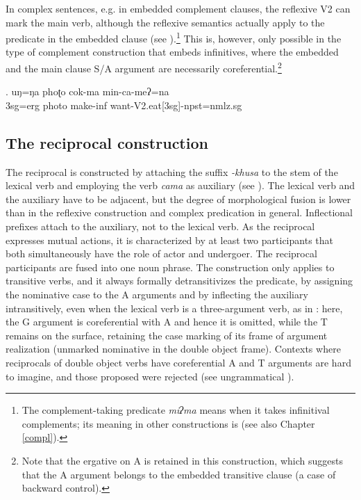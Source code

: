 In complex sentences, e.g. in embedded complement clauses, the reflexive V2 can mark the main verb, although the reflexive semantics actually apply to the predicate in the embedded clause (see \Next).\footnote{The complement-taking predicate \emph{miʔma} means  when it takes infinitival complements; its meaning in other constructions is  (see also Chapter \ref{compl}).} This is, however, only possible in the type of complement construction that embeds infinitives, where the embedded and the main clause  S/A argument are necessarily coreferential.\footnote{Note that the ergative on A is retained in this construction, which suggests that the A argument belongs to the embedded transitive clause (a case of backward control).} 


\exg. uŋ=ŋa phoʈo cok-ma min-ca-meʔ=na\\
		{\sc 3sg=erg} photo make{\sc -inf} want-{\sc V2.eat[3sg]-npst=nmlz.sg}	\\
 	



\subsection{The reciprocal construction}\label{refl3}

The reciprocal is constructed by attaching the suffix \emph{-khusa} to the stem of the lexical verb and employing the verb \emph{cama}  as auxiliary (see \Next[a]). The lexical verb and the auxiliary have to be adjacent, but the degree of morphological fusion is lower than in the reflexive construction and complex predication in general. Inflectional prefixes attach to the auxiliary, not to the lexical verb. As the reciprocal expresses mutual actions, it is characterized by at least two participants that both simultaneously have the role of actor and undergoer. The reciprocal participants are fused into one noun phrase. The construction only applies to transitive verbs, and it always formally detransitivizes the predicate, by assigning the nominative case to the A arguments and by inflecting the auxiliary intransitively, even when the lexical verb is a three-argument verb, as in  \Next[b]: here, the G argument  is coreferential with A and hence it is omitted, while the T remains on the surface, retaining the case marking of its frame of argument realization (unmarked nominative in the double object frame). Contexts where reciprocals of double object verbs have coreferential A and T arguments are hard to imagine, and those proposed were rejected (see ungrammatical \Next[c]). 

